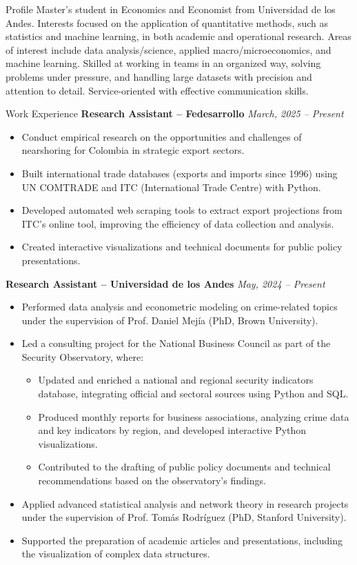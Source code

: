 \documentclass{resume}
\begin{document}
\begin{rSection}{Profile}
Master's student in Economics and Economist from Universidad de los Andes. Interests focused on the application of quantitative methods, such as statistics and machine learning, in both academic and operational research. Areas of interest include data analysis/science, applied macro/microeconomics, and machine learning. Skilled at working in teams in an organized way, solving problems under pressure, and handling large datasets with precision and attention to detail. Service-oriented with effective communication skills.
\end{rSection}

\begin{rSection}{Work Experience}
{\bf Research Assistant – Fedesarrollo} \hfill {\em March, 2025 – Present}
\begin{itemize}
    \item Conduct empirical research on the opportunities and challenges of nearshoring for Colombia in strategic export sectors.
    \item Built international trade databases (exports and imports since 1996) using UN COMTRADE and ITC (International Trade Centre) with Python.
    \item Developed automated web scraping tools to extract export projections from ITC's online tool, improving the efficiency of data collection and analysis.
    \item Created interactive visualizations and technical documents for public policy presentations.
\end{itemize}

{\bf Research Assistant – Universidad de los Andes} \hfill {\em May, 2024 – Present}
\begin{itemize}
    \item Performed data analysis and econometric modeling on crime-related topics under the supervision of Prof. Daniel Mejía (PhD, Brown University).
    \item Led a consulting project for the National Business Council as part of the Security Observatory, where:
    \begin{itemize}
        \item Updated and enriched a national and regional security indicators database, integrating official and sectoral sources using Python and SQL.
        \item Produced monthly reports for business associations, analyzing crime data and key indicators by region, and developed interactive Python visualizations.
        \item Contributed to the drafting of public policy documents and technical recommendations based on the observatory's findings.
    \end{itemize}
    \item Applied advanced statistical analysis and network theory in research projects under the supervision of Prof. Tomás Rodríguez (PhD, Stanford University).
    \item Supported the preparation of academic articles and presentations, including the visualization of complex data structures.
\end{itemize}


\end{rSection}
\end{document}

